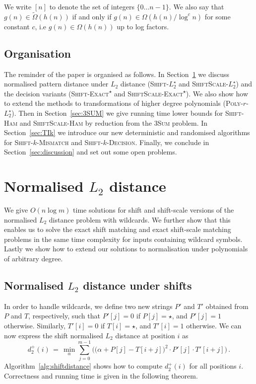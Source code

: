 \documentclass[11pt]{article}
\newcommand{\wildcard}{\ensuremath{\star}\xspace}
\newcommand{\sExactWild}{\textsc{Shift-Exact\textsuperscript{\wildcard}}\xspace}
\newcommand{\ssExactWild}{\textsc{ShiftScale-Exact\textsuperscript{\wildcard}}\xspace}
\newcommand{\sLtwoWild}{\textsc{Shift-$L_2^\wildcard$}\xspace}
\newcommand{\DsLtwoWild}{\ensuremath{d_2^+}}
\newcommand{\ssLtwoWild}{\textsc{ShiftScale-$L_2^\wildcard$}\xspace}
\newcommand{\LpolyWild}{\textsc{Poly-$r$-$L_2^\wildcard$}\xspace}
\newcommand{\sHam}{\textsc{Shift-Ham}\xspace}
\newcommand{\ssHam}{\textsc{ShiftScale-Ham}\xspace}
\newcommand{\skMismatch}{\textsc{Shift-$k$-Mismatch}\xspace}
\newcommand{\skDecision}{\textsc{Shift-$k$-Decision}\xspace}
\newcommand{\threeSUM}{\textsc{3Sum}\xspace}
\theoremstyle{plain}
\theoremstyle{definition}
\begin{document}
We write $[n]$ to denote the set of integers $\{0 \ldots n-1\}$. We also say that $g(n) \in \tilde{\Omega}(h(n))$ if and only if $g(n) \in \Omega(h(n)/\log^c{n})$ for some constant $c$, i.e $g(n) \in \Omega(h(n))$ up to log factors.


\subsection{Organisation}

The reminder of the paper is organised as follows. In Section~\ref{sec:TIL2} we discuss normalised pattern distance under $L_2$ distance (\sLtwoWild and \ssLtwoWild) and the decision variants (\sExactWild and \ssExactWild). We also show how to extend the methods to transformations of higher degree polynomials (\LpolyWild). Then in Section~\ref{sec:3SUM} we give running time lower bounds for \sHam and \ssHam by reduction from the \threeSUM problem.  In Section~\ref{sec:TIk} we introduce our new deterministic and randomised algorithms for \skMismatch and \skDecision. Finally, we conclude in Section~\ref{sec:discussion} and set out some open problems.


\section{Normalised $L_2$ distance}\label{sec:TIL2}

We give $O(n\log{m})$ time solutions for shift and shift-scale versions of the normalised $L_2$ distance problem with wildcards. We further show that this enables us to solve the exact shift matching and exact shift-scale matching problems in the same time complexity for inputs containing wildcard symbols. Lastly we show how to extend our solutions to normalisation under polynomials of arbitrary degree.

\subsection{Normalised $L_2$ distance under shifts}

In order to handle wildcards, we define two new strings $P'$ and $T'$ obtained from $P$ and $T$, respectively, such that $P'[j]=0$ if $P[j]=\wildcard$, and $P'[j]=1$ otherwise. Similarly, $T'[i]=0$ if $T[i]=\wildcard$, and $T'[i]=1$ otherwise. We can now express the shift normalised $L_2$ distance at position $i$ as
\begin{equation*}
    \DsLtwoWild(i) \,=\, \min_{\alpha} \sum_{j=0}^{m-1} \Big( \big(\alpha + P[j] - T[i+j]\big)^2 \cdot P'[j]\cdot T'[i+j] \Big) \,.
\end{equation*}
Algorithm~\ref{alg:shiftdistance} shows how to compute $\DsLtwoWild(i)$ for all positions $i$. Correctness and running time is given in the following theorem.
\end{document}
